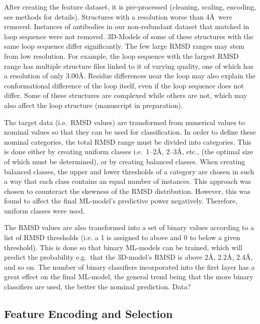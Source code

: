 \documentclass[12pt]{article}
\newcommand{\lilian}[1]{ {\color{red}{\bfseries Lilian:} #1}}
\begin{document}
After creating the feature dataset, it is pre-processed (cleaning,
scaling, encoding, see methods for details). Structures with a
resolution worse than 4\AA\ were removed.
Instances of antibodies in our non-redundant dataset that matched in loop sequence were
not removed. 3D-Models of some of these structures with the same loop
sequence differ significantly. The few large RMSD ranges may stem from
low resolution. For example, the loop sequence with the largest RMSD range 
has multiple structure files linked to it of varying quality, one of which has a resolution of only 3.00\AA. Residue differences near the loop may also
explain the conformational difference of the loop itself, 
even if the loop sequence does not differ. Some of these structures are
complexed while others are not, which may also affect the loop
structure (manuscript in preparation).


The target data (i.e.\ RMSD values) are transformed from numerical
values to nominal values so that they can be used for
classification. In order to define these nominal categories, the total
RMSD range must be divided into categories. This is done either by
creating uniform classes i.e.\ 1--2\AA, 2--3\AA, etc., (the optimal size of which
must be determined), or by creating balanced classes. When
creating balanced classes, the upper and lower thresholds of a
category are chosen in such a way that each class contains an equal
number of instances. This approach was chosen to counteract the
skewness of the RMSD distribution. However, this was found to
affect the final ML-model's predictive power negatively. Therefore,
uniform classes were used.

The RMSD values are also transformed into a set of binary values according to a
list of RMSD thresholds (i.e. a 1 is assigned to above and 0 to below a given threshold). This is done so that binary ML-models can be
trained, which will predict the probability e.g.\ that the 3D-model's RMSD
is above 2\AA, 2.2\AA, 2.4\AA, and so on. The number of binary
classifiers incorporated into the first layer has a great effect on
the final ML-model, the general trend being that the more binary
classifiers are used, the better the nominal prediction. \lilian{Data?}

\subsection{Feature Encoding and Selection}
\end{document}
